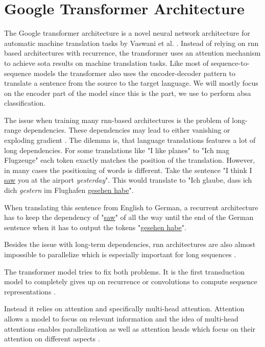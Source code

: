 \section{Google Transformer Architecture}
\label{sec:03_transformer}
The Google transformer architecture is a novel neural network architecture for automatic machine translation tasks by Vaswani et al. \cite{Vaswani2017d}. Instead of relying on \gls{rnn} based architectures with recurrence, the transformer uses an attention mechanism to achieve \gls{sota} results on machine translation tasks. Like most of sequence-to-sequence models the transformer also uses the encoder-decoder pattern to translate a sentence from the source to the target language. We will mostly focus on the encoder part of the model since this is the part, we use to perform \gls{absa} classification.
\medskip

The issue when training many \gls{rnn}-based architectures is the problem of long-range dependencies. These dependencies may lead to either vanishing or exploding gradient \cite{Hochreiter2009}. The dilemma is, that language translations features a lot of long dependencies. For some translations like "I like planes" to "Ich mag Flugzeuge" each token exactly matches the position of the translation. However, in many cases the positioning of words is different. Take the sentence "I think I \underline{saw} you at the airport \emph{yesterday}". This would translate to "Ich glaube, dass ich dich \emph{gestern} im Flughafen \underline{gesehen habe}".

When translating this sentence from English to German, a recurrent architecture has to keep the dependency of "\underline{saw}" of all the way until the end of the German sentence when it has to output the tokens "\underline{gesehen habe}".
\medskip

Besides the issue with long-term dependencies, \gls{rnn} architectures are also almost impossible to parallelize which is especially important for long sequences \cite{Vaswani2017d}.
\medskip

The transformer model tries to fix both problems. It is the first transduction model to completely gives up on recurrence or convolutions to compute sequence representations \cite{Vaswani2017d}. 

Instead it relies on attention and specifically multi-head attention. Attention allows a model to focus on relevant information and the idea of multi-head attentions enables parallelization as well as attention heads which focus on their attention on different aspects \cite{Vaswani2017d}.

